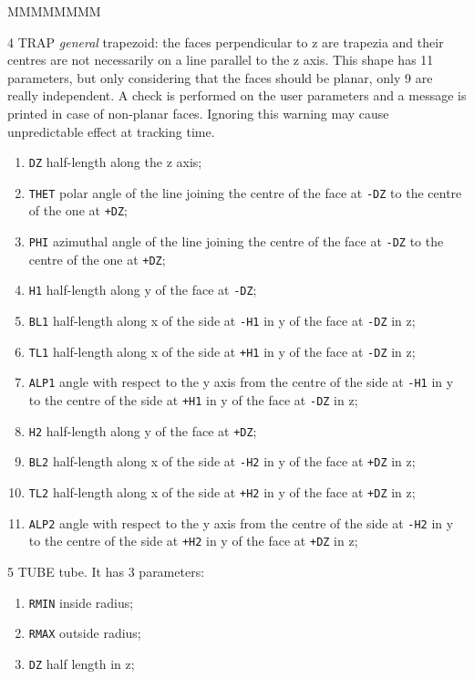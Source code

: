 \begin{DLtt}{MMMMMMMM}
\item[4  TRAP] {\it general} trapezoid: the
faces perpendicular to z are trapezia and their centres are not necessarily
on a line parallel to the z axis. This shape has 11 parameters, but only 
considering that the faces should be planar, only 9 are really independent.
A check is performed on the user parameters and a message is printed in
case of non-planar faces. Ignoring this warning may cause unpredictable
effect at tracking time.
\begin{enumerate}
\item {\tt DZ} half-length along the z axis;
\item {\tt THET} polar angle of the line joining the centre of the
face at {\tt -DZ} to the centre of the one at {\tt +DZ};
\item {\tt PHI} azimuthal angle of the line joining the centre of the
face at {\tt -DZ} to the centre of the one at {\tt +DZ};
\item {\tt H1} half-length along y of the face at {\tt -DZ};
\item {\tt BL1} half-length along x of the side at {\tt -H1}
in y of the face at {\tt -DZ} in z;
\item {\tt TL1} half-length along x of the side at {\tt +H1}
in y of the face at {\tt -DZ} in z;
\item {\tt ALP1} angle with respect to the y axis from the centre
of the side at {\tt -H1} in y to the centre 
of the side at {\tt +H1} in y of the face at {\tt -DZ} in z;
\item {\tt H2} half-length along y of the face at {\tt +DZ};
\item {\tt BL2} half-length along x of the side at {\tt -H2}
in y of the face at {\tt +DZ} in z;
\item {\tt TL2} half-length along x of the side at {\tt +H2}
in y of the face at {\tt +DZ} in z;
\item {\tt ALP2} angle with respect to the y axis from the centre
of the side at {\tt -H2} in y to the centre 
of the side at {\tt +H2} in y of the face at {\tt +DZ} in z;
\end{enumerate}
 
\item[5  TUBE] tube. It has 3 parameters:
\begin{enumerate}
\item {\tt RMIN} inside radius;
\item {\tt RMAX} outside radius;
\item {\tt DZ} half length in z;
\end{enumerate}


\end{DLtt}
